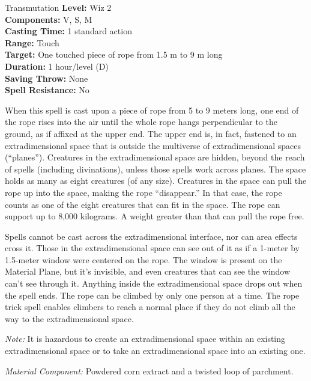 {Transmutation}
{
	\textbf{Level:}
	Wiz 2\\
	\textbf{Components:}
	V, S, M\\
	\textbf{Casting Time:}
	1 standard action\\
	\textbf{Range:}
	Touch\\
	\textbf{Target:}
	One touched piece of rope from 1.5 m to 9 m long\\
	\textbf{Duration:}
	1 hour/level (D)\\
	\textbf{Saving Throw:}
	None\\
	\textbf{Spell Resistance:}
	No\\
}
{
	When this spell is cast upon a piece of rope from 5 to 9 meters long, one end of the rope rises into the air until the whole rope hangs perpendicular to the ground, as if affixed at the upper end. The upper end is, in fact, fastened to an extradimensional space that is outside the multiverse of extradimensional spaces (``planes''). Creatures in the extradimensional space are hidden, beyond the reach of spells (including divinations), unless those spells work across planes. The space holds as many as eight creatures (of any size). Creatures in the space can pull the rope up into the space, making the rope ``disappear.'' In that case, the rope counts as one of the eight creatures that can fit in the space. The rope can support up to 8,000 kilograms. A weight greater than that can pull the rope free.

	Spells cannot be cast across the extradimensional interface, nor can area effects cross it. Those in the extradimensional space can see out of it as if a 1-meter by 1.5-meter window were centered on the rope. The window is present on the Material Plane, but it's invisible, and even creatures that can see the window can't see through it. Anything inside the extradimensional space drops out when the spell ends. The rope can be climbed by only one person at a time. The rope trick spell enables climbers to reach a normal place if they do not climb all the way to the extradimensional space.

	\textit{Note:} It is hazardous to create an extradimensional space within an existing extradimensional space or to take an extradimensional space into an existing one.

	\textit{Material Component:}
	Powdered corn extract and a twisted loop of parchment.

}
